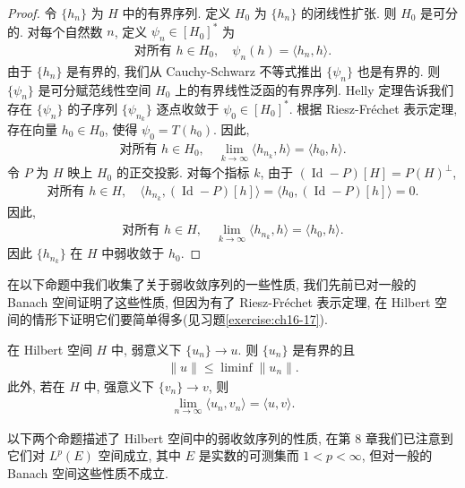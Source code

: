 \documentclass[../../main.tex]{subfiles}
\begin{document}
\begin{proof}
令 $\{h_{n}\}$ 为 $H$ 中的有界序列. 定义 $H_{0}$ 为 $\{h_{n}\}$ 的闭线性扩张. 则 $H_{0}$ 是可分的. 对每个自然数 $n$, 定义 $\psi_{n}\in[H_{0}]^{*}$ 为
\begin{align*}
\text{对所有 }h\in H_{0},\quad\psi_{n}(h)=\langle h_{n},h\rangle.
\end{align*}
由于 $\{h_{n}\}$ 是有界的, 我们从 Cauchy-Schwarz 不等式推出 $\{\psi_{n}\}$ 也是有界的. 则 $\{\psi_{n}\}$ 是可分赋范线性空间 $H_{0}$ 上的有界线性泛函的有界序列. Helly 定理告诉我们存在 $\{\psi_{n}\}$ 的子序列 $\{\psi_{n_{k}}\}$ 逐点收敛于 $\psi_{0}\in[H_{0}]^{*}$. 根据 Riesz-Fr\'echet 表示定理, 存在向量 $h_{0}\in H_{0}$, 使得 $\psi_{0}=T(h_{0})$. 因此,
\begin{align*}
\text{对所有 }h\in H_{0},\quad\lim_{k\to\infty}\langle h_{n_{k}},h\rangle=\langle h_{0},h\rangle.
\end{align*}
令 $P$ 为 $H$ 映上 $H_{0}$ 的正交投影. 对每个指标 $k$, 由于 $(\operatorname{Id}-P)[H]=P(H)^{\perp}$,
\begin{align*}
\text{对所有 }h\in H,\quad\langle h_{n_{k}},(\operatorname{Id}-P)[h]\rangle=\langle h_{0},(\operatorname{Id}-P)[h]\rangle=0.
\end{align*}
因此,
\begin{align*}
\text{对所有 }h\in H,\quad\lim_{k\to\infty}\langle h_{n_{k}},h\rangle=\langle h_{0},h\rangle.
\end{align*}
因此 $\{h_{n_{k}}\}$ 在 $H$ 中弱收敛于 $h_{0}$.
\end{proof}

在以下命题中我们收集了关于弱收敛序列的一些性质, 我们先前已对一般的 Banach 空间证明了这些性质, 但因为有了 Riesz-Fr\'echet 表示定理, 在 Hilbert 空间的情形下证明它们要简单得多(见习题\cref{exercise:ch16-17}).

\begin{proposition}\label{proposition:ch16-weak-properties}
在 Hilbert 空间 $H$ 中, 弱意义下 $\{u_{n}\}\to u$. 则 $\{u_{n}\}$ 是有界的且
\begin{align*}
\|u\|\leqslant\liminf\|u_{n}\|.
\end{align*}
此外, 若在 $H$ 中, 强意义下 $\{v_{n}\}\to v$, 则
\begin{align}
\lim_{n\to\infty}\langle u_{n},v_{n}\rangle=\langle u,v\rangle.\label{align:ch16-weak-inner}
\end{align}
\end{proposition}

以下两个命题描述了 Hilbert 空间中的弱收敛序列的性质, 在第 8 章我们已注意到它们对 $L^{p}(E)$ 空间成立, 其中 $E$ 是实数的可测集而 $1<p<\infty$, 但对一般的 Banach 空间这些性质不成立.
\end{document}
